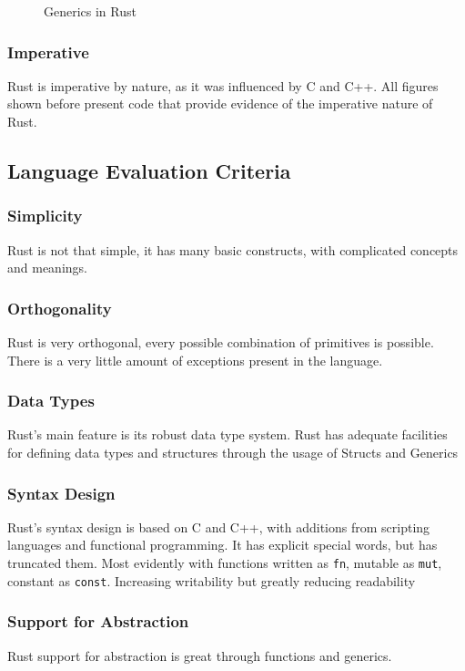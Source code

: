 \documentclass{article}
\newcommand{\rust}[1]{\inputminted{rust}{samples/rust/#1.rs}}
\newcommand{\rustin}[1]{\texttt{#1}}
\begin{document}
  \begin{figure}[ht]
    \rust{iterator}
    \caption{Generics in Rust}
    \label{fig:generic}
  \end{figure}


  \subsubsection{Imperative}
  Rust is imperative by nature, as it was influenced by C and C++. All figures
  shown before present code that provide evidence of the imperative nature of
  Rust.

  \subsection{Language Evaluation Criteria}

  \subsubsection{Simplicity}
  Rust is not that simple, it has many basic constructs, with complicated
  concepts and meanings.

  \subsubsection{Orthogonality}
  Rust is very orthogonal, every possible combination of primitives is possible.
  There is a very little amount of exceptions present in the language.

  \subsubsection{Data Types}
  Rust's main feature is its robust data type system. Rust has adequate
  facilities for defining data types and structures through the usage of Structs
  and Generics

  \subsubsection{Syntax Design}
  Rust's syntax design is based on C and C++, with additions from scripting
  languages and functional programming. It has explicit special words, but has
  truncated them. Most evidently with functions written as \rustin{fn}, mutable
  as \rustin{mut}, constant as \rustin{const}. Increasing writability but
  greatly reducing readability

  \subsubsection{Support for Abstraction}
  Rust support for abstraction is great through functions and generics.
\end{document}
